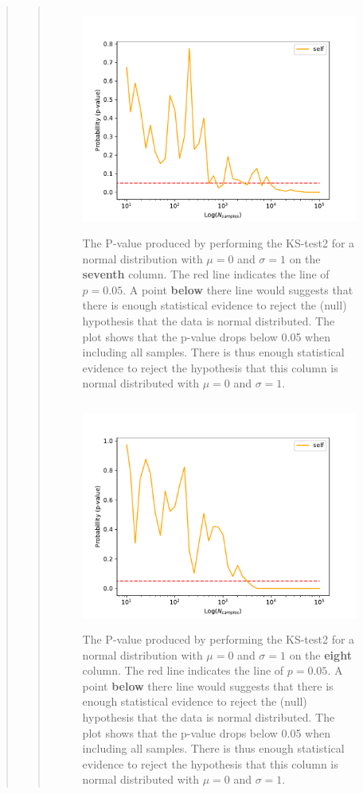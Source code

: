 \begin{quote}
\begin{quote}
\newpage

\begin{figure}[!ht]
\centering
\includegraphics[width=12cm, height=7.5cm]{./Plots/1e_plot_column_6.pdf}
\caption{The P-value produced by performing the KS-test2 for a normal distribution with $\mu = 0$ and $\sigma = 1$ on the \textbf{seventh} column.  The red line indicates the line of $ p = 0.05$. A point \textbf{below} there  line would suggests that there is enough statistical evidence to reject the (null) hypothesis that the data is normal distributed. The plot shows that the p-value drops below 0.05 when including all samples. There is thus enough statistical evidence to reject the hypothesis that this column is normal distributed with $\mu = 0$ and $\sigma = 1$.}
\end{figure}


\begin{figure}[!ht]
\centering
\includegraphics[width=12cm, height=7.5cm]{./Plots/1e_plot_column_7.pdf}
\caption{The P-value produced by performing the KS-test2 for a normal distribution with $\mu = 0$ and $\sigma = 1$ on the \textbf{eight} column.  The red line indicates the line of $ p = 0.05$. A point \textbf{below} there  line would suggests that there is enough statistical evidence to reject the (null) hypothesis that the data is normal distributed. The plot shows that the p-value drops below 0.05 when including all samples. There is thus enough statistical evidence to reject the hypothesis that this column is normal distributed with $\mu = 0$ and $\sigma = 1$.}
\end{figure}


\end{quote}
\end{quote}
